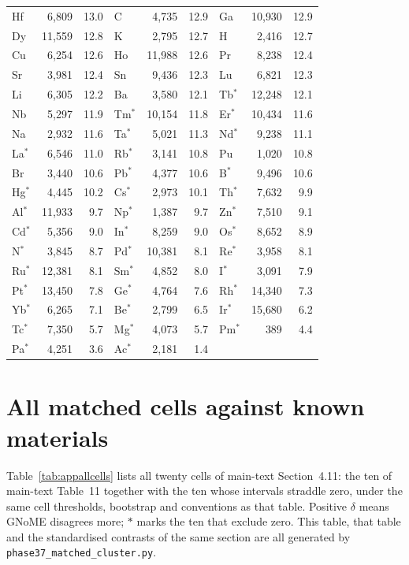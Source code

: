 \documentclass[11pt]{article}
\begin{document}
\begin{longtable}{lrr@{\hspace{1.6em}}lrr@{\hspace{1.6em}}lrr}
Hf & 6{,}809 & 13.0 & C & 4{,}735 & 12.9 & Ga & 10{,}930 & 12.9 \\
Dy & 11{,}559 & 12.8 & K & 2{,}795 & 12.7 & H & 2{,}416 & 12.7 \\
Cu & 6{,}254 & 12.6 & Ho & 11{,}988 & 12.6 & Pr & 8{,}238 & 12.4 \\
Sr & 3{,}981 & 12.4 & Sn & 9{,}436 & 12.3 & Lu & 6{,}821 & 12.3 \\
Li & 6{,}305 & 12.2 & Ba & 3{,}580 & 12.1 & Tb$^{*}$ & 12{,}248 & 12.1 \\
Nb & 5{,}297 & 11.9 & Tm$^{*}$ & 10{,}154 & 11.8 & Er$^{*}$ & 10{,}434 & 11.6 \\
Na & 2{,}932 & 11.6 & Ta$^{*}$ & 5{,}021 & 11.3 & Nd$^{*}$ & 9{,}238 & 11.1 \\
La$^{*}$ & 6{,}546 & 11.0 & Rb$^{*}$ & 3{,}141 & 10.8 & Pu & 1{,}020 & 10.8 \\
Br & 3{,}440 & 10.6 & Pb$^{*}$ & 4{,}377 & 10.6 & B$^{*}$ & 9{,}496 & 10.6 \\
Hg$^{*}$ & 4{,}445 & 10.2 & Cs$^{*}$ & 2{,}973 & 10.1 & Th$^{*}$ & 7{,}632 & 9.9 \\
Al$^{*}$ & 11{,}933 & 9.7 & Np$^{*}$ & 1{,}387 & 9.7 & Zn$^{*}$ & 7{,}510 & 9.1 \\
Cd$^{*}$ & 5{,}356 & 9.0 & In$^{*}$ & 8{,}259 & 9.0 & Os$^{*}$ & 8{,}652 & 8.9 \\
N$^{*}$ & 3{,}845 & 8.7 & Pd$^{*}$ & 10{,}381 & 8.1 & Re$^{*}$ & 3{,}958 & 8.1 \\
Ru$^{*}$ & 12{,}381 & 8.1 & Sm$^{*}$ & 4{,}852 & 8.0 & I$^{*}$ & 3{,}091 & 7.9 \\
Pt$^{*}$ & 13{,}450 & 7.8 & Ge$^{*}$ & 4{,}764 & 7.6 & Rh$^{*}$ & 14{,}340 & 7.3 \\
Yb$^{*}$ & 6{,}265 & 7.1 & Be$^{*}$ & 2{,}799 & 6.5 & Ir$^{*}$ & 15{,}680 & 6.2 \\
Tc$^{*}$ & 7{,}350 & 5.7 & Mg$^{*}$ & 4{,}073 & 5.7 & Pm$^{*}$ & 389 & 4.4 \\
Pa$^{*}$ & 4{,}251 & 3.6 & Ac$^{*}$ & 2{,}181 & 1.4 &  & &  \\
\bottomrule
\end{longtable}
\normalsize

\section{All matched cells against known materials}\label{app:allcells}

Table~\ref{tab:appallcells} lists all twenty cells of main-text Section~4.11: the ten of
main-text Table~11 together with the ten whose intervals straddle zero, under the
same cell thresholds, bootstrap and conventions as that table. Positive $\delta$ means
GNoME disagrees more; $\ast$ marks the ten that exclude zero. This table, that table
and the standardised contrasts of the same section are all generated by
\texttt{phase37\_matched\_cluster.py}.
\end{document}
